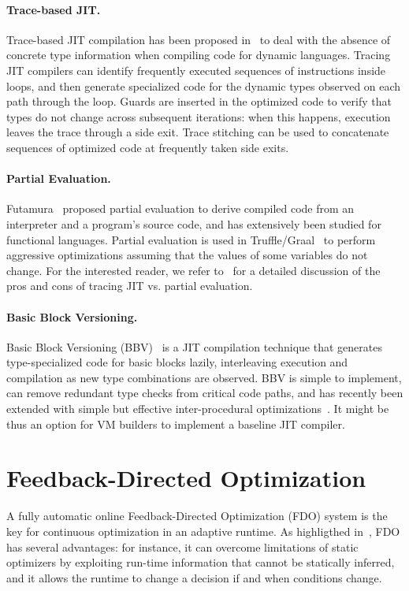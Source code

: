 \paragraph*{Trace-based JIT.} Trace-based JIT compilation has been proposed in~\cite{Gal09} to deal with the absence of concrete type information when compiling code for dynamic languages. Tracing JIT compilers can identify frequently executed sequences of instructions inside loops, and then generate specialized code for the dynamic types observed on each path through the loop. Guards are inserted in the optimized code to verify that types do not change across subsequent iterations: when this happens, execution leaves the trace through a side exit. Trace stitching can be used to concatenate sequences of optimized code at frequently taken side exits.

\paragraph*{Partial Evaluation.} Futamura~\cite{Futamura99} proposed partial evaluation to derive compiled code from an interpreter and a program's source code, and has extensively been studied for functional languages. Partial evaluation is used in Truffle/Graal~\cite{Wurthinger13} to perform aggressive optimizations assuming that the values of some variables do not change. For the interested reader, we refer to~\cite{Marr15} for a detailed discussion of the pros and cons of tracing JIT vs. partial evaluation.

\paragraph*{Basic Block Versioning.} Basic Block Versioning (BBV)~\cite{ChevalierBoisvert15} is a JIT compilation technique that generates type-specialized code for basic blocks lazily, interleaving execution and compilation as new type combinations are observed. BBV is simple to implement, can remove redundant type checks from critical code paths, and has recently been extended with simple but effective inter-procedural optimizations~\cite{ChevalierBoisvert16}. It might be thus an option for VM builders to implement a baseline JIT compiler.

\section{Feedback-Directed Optimization}
A fully automatic online Feedback-Directed Optimization (FDO) system is the key for continuous optimization in an adaptive runtime. As highligthed in~\cite{Arnold05}, FDO has several advantages: for instance, it can overcome limitations of static optimizers by exploiting run-time information that cannot be statically inferred, and it allows the runtime to change a decision if and when conditions change.

